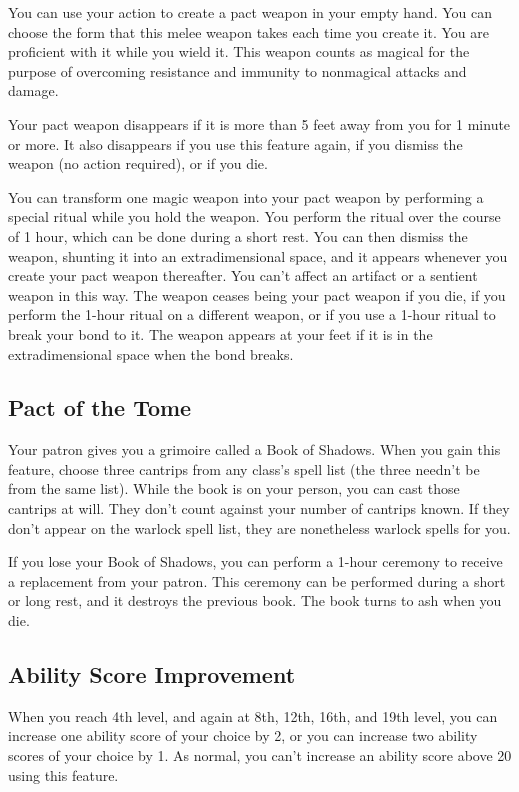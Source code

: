 You can use your action to create a pact weapon in your empty hand. You can choose the form that this melee weapon takes each time you create it. You are proficient with it while you wield it. This weapon counts as magical for the purpose of overcoming resistance and immunity to nonmagical attacks and damage.

Your pact weapon disappears if it is more than 5 feet away from you for 1 minute or more. It also disappears if you use this feature again, if you dismiss the weapon (no action required), or if you die.

You can transform one magic weapon into your pact weapon by performing a special ritual while you hold the weapon. You perform the ritual over the course of 1 hour, which can be done during a short rest. You can then dismiss the weapon, shunting it into an extradimensional space, and it appears whenever you create your pact weapon thereafter. You can’t affect an artifact or a sentient weapon in this way. The weapon ceases being your pact weapon if you die, if you perform the 1-hour ritual on a different weapon, or if you use a 1-hour ritual to break your bond to it. The weapon appears at your feet if it is in the extradimensional space when the bond breaks.

\subsection{Pact of the Tome}

Your patron gives you a grimoire called a Book of Shadows. When you gain this feature, choose three cantrips from any class’s spell list (the three needn’t be from the same list). While the book is on your person, you can cast those cantrips at will. They don’t count against your number of cantrips known. If they don’t appear on the warlock spell list, they are nonetheless warlock spells for you.

If you lose your Book of Shadows, you can perform a 1-hour ceremony to receive a replacement from your patron. This ceremony can be performed during a short or long rest, and it destroys the previous book. The book turns to ash when you die.

\subsection{Ability Score Improvement}

When you reach 4th level, and again at 8th, 12th, 16th, and 19th level, you can increase one ability score of your choice by 2, or you can increase two ability scores of your choice by 1. As normal, you can’t increase an ability score above 20 using this feature.

